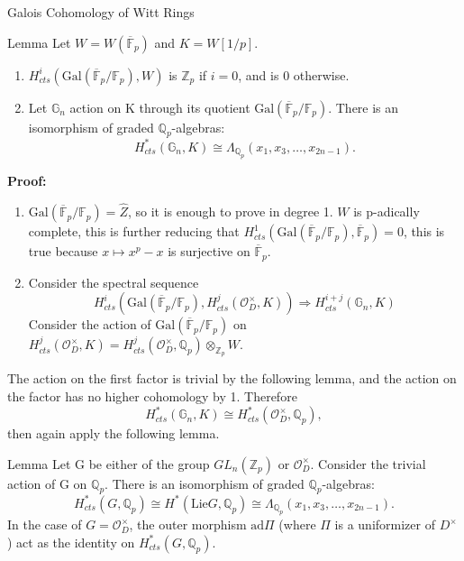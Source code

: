\documentclass[aspectratio=1610]{ctexbeamer}
\def  \Gal      {\mathrm{Gal}}
\def  \Lie      {\mathrm{Lie}}
\def  \co       {\mathcal{O}}
\def  \bF       {\mathbb{F}}
\def  \bg       {\mathbb{G}}
\def  \bq       {\mathbb{Q}}
\def  \bz       {\mathbb{Z}}
\begin{document}
\begin{frame}{Galois Cohomology of Witt Rings}
	\begin{alertblock}{Lemma}
	 Let $W= W(\overline{\bF}_p)$ and $K= W[1/p]$.
	 \begin{enumerate}
	 	\item $H^i_{cts}(\Gal(\overline{\bF}_p/\bF_p), W)$ is $\bz_p$ if $i=0$, and is $0$ otherwise.
	 	\item Let $\bg_n$ action on K through its quotient $\Gal(\overline{\bF}_p/\bF_p)$. There is an isomorphism of graded $\bq_p$-algebras:
	 	$$
	 	H^*_{cts}(\bg_n, K) \cong \Lambda_{\bq_p}(x_1, x_3, \dots, x_{2n-1}).
	 	$$
	 \end{enumerate}
	\end{alertblock}

\textbf{Proof: }
\begin{enumerate}
	\item $\Gal(\overline{\bF}_p/\bF_p)  = \widehat{Z}$, so  it is enough to prove in degree 1. $W$ is p-adically complete, this is further reducing that $H^1_{cts}(\Gal(\overline{\bF}_p/\bF_p), \overline{\bF}_p)=0$, this is true because $x \mapsto x^p - x$ is surjective on $\overline{\bF}_p$.
	\item Consider the spectral sequence
	$$
	H^i_{cts}(\Gal(\overline{\bF}_p/\bF_p),H^j_{cts}(\co_D^{\times},K)) \Longrightarrow H^{i+j}_{cts}(\bg_n, K)
	$$
	Consider the action of $\Gal(\overline{\bF}_p/\bF_p)$ on $H^j_{cts}(\co_D^{\times}, K)  = H^j_{cts}(\co_D^{\times}, \bq_p) \otimes_{\bz_p} W$.
\end{enumerate}
\end{frame}




\begin{frame}
	The action on the first factor is trivial by the following lemma, and the action on the factor has no higher cohomology by 1. Therefore
	$$
	H^*_{cts}(\bg_n,K) \cong H^*_{cts}(\co_D^{\times}, \bq_p),
	$$
    then again apply the following lemma.

\begin{alertblock}{Lemma}
	Let G be either of the group $GL_n(\bz_p)$ or $\co_D^{\times}$. Consider the trivial action of G  on $\bq_p$. There is an isomorphism of graded $\bq_p$-algebras:
	$$
	H^*_{cts}(G, \bq_p) \cong H^*(\Lie G, \bq_p) \cong \Lambda_{\bq_p}(x_1, x_3, \dots, x_{2n-1}).
	$$
	In the case of $G= \co_D^{\times}$, the outer morphism $\mathrm{ad} \Pi$ (where $\Pi$ is a uniformizer of $D^{\times}$) act as the identity on $H^*_{cts}(G, \bq_p)$.
\end{alertblock}
\end{frame}
\end{document}

